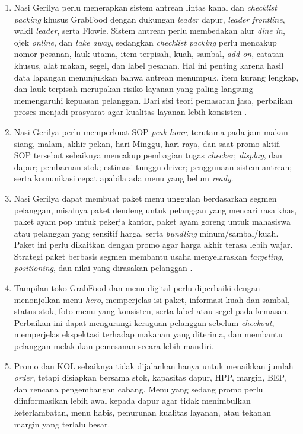 \begin{enumerate}
    \item Nasi Gerilya perlu menerapkan sistem antrean lintas kanal dan \textit{checklist packing} khusus GrabFood dengan dukungan \textit{leader} dapur, \textit{leader frontline}, wakil \textit{leader}, serta Flowie. Sistem antrean perlu membedakan alur \textit{dine in}, ojek \textit{online}, dan \textit{take away}, sedangkan \textit{checklist packing} perlu mencakup nomor pesanan, lauk utama, item terpisah, kuah, sambal, \textit{add-on}, catatan khusus, alat makan, segel, dan label pesanan. Hal ini penting karena hasil data lapangan menunjukkan bahwa antrean menumpuk, item kurang lengkap, dan lauk terpisah merupakan risiko layanan yang paling langsung memengaruhi kepuasan pelanggan. Dari sisi teori pemasaran jasa, perbaikan proses menjadi prasyarat agar kualitas layanan lebih konsisten \parencite{wirtz2024servicesmarketing}.

    \item Nasi Gerilya perlu memperkuat SOP \textit{peak hour}, terutama pada jam makan siang, malam, akhir pekan, hari Minggu, hari raya, dan saat promo aktif. SOP tersebut sebaiknya mencakup pembagian tugas \textit{checker}, \textit{display}, dan dapur; pembaruan stok; estimasi tunggu driver; penggunaan sistem antrean; serta komunikasi cepat apabila ada menu yang belum \textit{ready}.

    \item Nasi Gerilya dapat membuat paket menu unggulan berdasarkan segmen pelanggan, misalnya paket dendeng untuk pelanggan yang mencari rasa khas, paket ayam pop untuk pekerja kantor, paket ayam goreng untuk mahasiswa atau pelanggan yang sensitif harga, serta \textit{bundling} minum/sambal/kuah. Paket ini perlu dikaitkan dengan promo agar harga akhir terasa lebih wajar. Strategi paket berbasis segmen membantu usaha menyelaraskan \textit{targeting}, \textit{positioning}, dan nilai yang dirasakan pelanggan \parencite{kotler2023principlesmarketing}.

    \item Tampilan toko GrabFood dan menu digital perlu diperbaiki dengan menonjolkan menu \textit{hero}, memperjelas isi paket, informasi kuah dan sambal, status stok, foto menu yang konsisten, serta label atau segel pada kemasan. Perbaikan ini dapat mengurangi keraguan pelanggan sebelum \textit{checkout}, memperjelas ekspektasi terhadap makanan yang diterima, dan membantu pelanggan melakukan pemesanan secara lebih mandiri.

    \item Promo dan KOL sebaiknya tidak dijalankan hanya untuk menaikkan jumlah \textit{order}, tetapi disiapkan bersama stok, kapasitas dapur, HPP, margin, BEP, dan rencana pengembangan cabang. Menu yang sedang promo perlu diinformasikan lebih awal kepada dapur agar tidak menimbulkan keterlambatan, menu habis, penurunan kualitas layanan, atau tekanan margin yang terlalu besar.


\end{enumerate}
